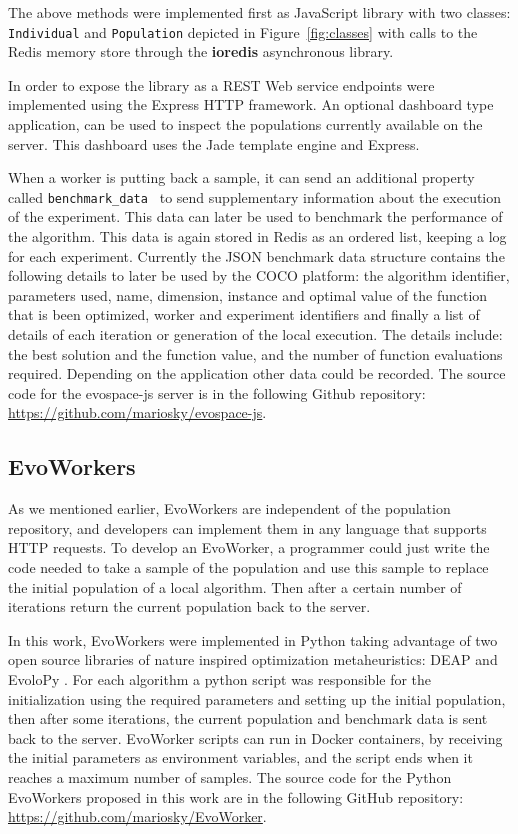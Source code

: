 The above methods were implemented first as JavaScript library 
with two classes: {\tt Individual} and {\tt Population} depicted 
in Figure~\ref{fig:classes} with calls to the Redis memory store %
through the {\bf ioredis} asynchronous library. 

In order to expose the library as a 
REST Web service endpoints were implemented using the Express HTTP framework.
An optional dashboard type application, can be used to inspect 
the populations currently available on the server. This dashboard uses
the Jade template engine and Express.

When a worker is putting back a sample, it can send 
an additional property called {\tt benchmark\_data }
to send supplementary information about the execution 
of the experiment.  This data can later be used to 
benchmark the performance of the algorithm. This 
data is again stored in Redis as an ordered list, 
keeping a log for each experiment. Currently the JSON 
benchmark data structure contains the following details 
to later be used by the COCO platform: the algorithm identifier, 
parameters used, name, dimension, instance and optimal value 
of the function that is been optimized, worker and experiment 
identifiers and finally a list of details of each iteration 
or generation of the local execution. The details include:
the best solution and the function value, and the number of
function evaluations required. Depending on the application
other data could be recorded. The source code for the {\sf evospace-js}
server is in the following Github repository: 
\url{https://github.com/mariosky/evospace-js}.


\subsection{EvoWorkers}
\label{sec:evoworkers}
As we mentioned earlier, EvoWorkers are independent of 
the population repository, and developers can implement them 
in any language that supports HTTP requests. To develop an 
EvoWorker, a programmer could just write the code needed to 
take a sample of the population and use this sample to 
replace the initial population of a local algorithm. 
Then after a certain number of iterations return the 
current population back to the server.

In this work, EvoWorkers were implemented in Python 
taking advantage of two open source libraries of nature inspired optimization 
metaheuristics:  DEAP \cite{fortin2012deap} and EvoloPy 
\cite{DBLP:conf/ijcci/FarisAMCM16}. For each algorithm a 
python script was responsible for the initialization using 
the required parameters and setting up the initial population, 
then after some iterations, the current population and 
benchmark data is sent back to the server. EvoWorker 
scripts can run in Docker containers, by receiving 
the initial parameters as environment variables, and 
the script ends when it reaches a maximum number of samples.
The source code for the Python EvoWorkers
proposed in this work are in the following GitHub repository: 
\url{https://github.com/mariosky/EvoWorker}.

